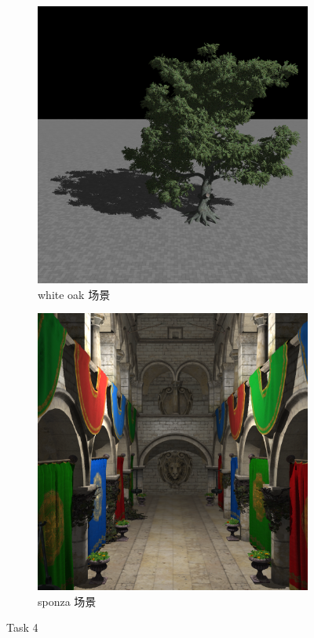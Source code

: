\documentclass[UTF8]{ctexart}
\begin{document}
\begin{figure}[htbp]
    \begin{subfigure}[b]{0.49\textwidth}
        \centering
        \includegraphics[width=\textwidth]{images/4-1.png}
        \caption{white oak 场景}
    \end{subfigure}
    \hfill
    \begin{subfigure}[b]{0.49\textwidth}
        \centering
        \includegraphics[width=\textwidth]{images/4-2.png}
        \caption{sponza 场景}
    \end{subfigure}
    \caption*{Task 4}
\end{figure}
\end{document}
